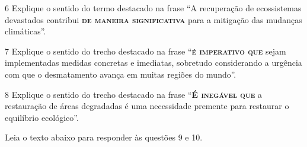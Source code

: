\num{6} Explique o sentido do termo destacado na frase ``A recuperação de
ecossistemas devastados contribui \textsc{\textbf{de maneira significativa}} para a mitigação das
mudanças climáticas''.


\num{7} Explique o sentido do trecho destacado na frase ``\textsc{\textbf{é imperativo que}} sejam 
implementadas medidas concretas e imediatas, sobretudo considerando a urgência com que o
desmatamento avança em muitas regiões do mundo''.


\num{8} Explique o sentido do trecho destacado na frase ``\textsc{\textbf{É
inegável que}} a restauração de áreas degradadas é uma necessidade premente
para restaurar o equilíbrio ecológico''.


Leia o texto abaixo para responder às questões 9 e 10.

